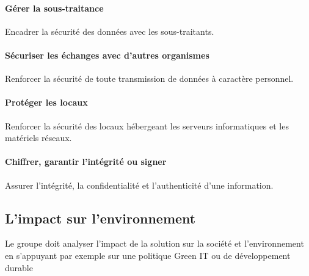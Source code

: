 \paragraph{Gérer la sous-traitance}

Encadrer la sécurité des données avec les sous-traitants.

\paragraph{Sécuriser les échanges avec d'autres organismes}

Renforcer la sécurité de toute transmission de données à caractère
personnel.

\paragraph{Protéger les locaux}

Renforcer la sécurité des locaux hébergeant les serveurs informatiques
et les matériels réseaux.

\paragraph{Chiffrer, garantir l'intégrité ou signer}

Assurer l'intégrité, la confidentialité et l'authenticité d'une
information.

\subsection{L'impact sur l'environnement}

Le groupe doit analyser l'impact de la solution sur la société et
l'environnement en s'appuyant par exemple sur une politique Green IT ou
de développement durable

